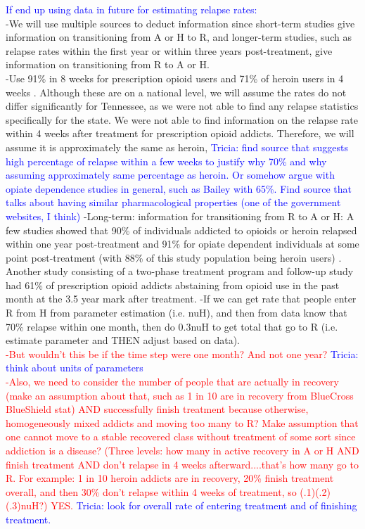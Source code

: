 \documentclass[12pt]{article}
\begin{document}
\textcolor{blue}{If end up using data in future for estimating relapse rates:} \\
-We will use multiple sources to deduct information since short-term studies give information on transitioning from A or H to R, and longer-term studies, such as relapse rates within the first year or within three years post-treatment, give information on transitioning from R to A or H. \\
 -Use 91\% in 8 weeks for prescription opioid users and 71\% of heroin users in 4 weeks \cite{Weiss, Smyth}. Although these are on a national level, we will assume the rates do not differ significantly for Tennessee, as we were not able to find any relapse statistics specifically for the state. We were not able to find information on the relapse rate within 4 weeks after treatment for prescription opioid addicts. Therefore, we will assume it is approximately the same as heroin, \textcolor{blue}{Tricia: find source that suggests high percentage of relapse within a few weeks to justify why 70\% and why assuming approximately same percentage as heroin. Or somehow argue with opiate dependence studies in general, such as Bailey with 65\%. Find source that talks about having similar pharmacological properties (one of the government websites, I think)} 
-Long-term: information for transitioning from R to A or H:
A few studies showed that 90\% of individuals addicted to opioids or heroin relapsed within one year post-treatment and 91\% for opiate dependent individuals at some point post-treatment (with 88\% of this study population being heroin users) \cite{Bailey, Smyth}. Another study consisting of a two-phase treatment program and follow-up study had 61\% of prescription opioid addicts abstaining from opioid use in the past month at the 3.5 year mark after treatment. 
-If we can get rate that people enter R from H from parameter estimation (i.e. nuH), and then from data know that 70\% relapse within one month, then do 0.3nuH to get total that go to R (i.e. estimate parameter and THEN adjust based on data).\\ 
\textcolor{red}{-But wouldn't this be if the time step were one month? And not one year? \textcolor{blue}{Tricia: think about units of parameters} \\
-Also, we need to consider the number of people that are actually in recovery (make an assumption about that, such as 1 in 10 are in recovery from BlueCross BlueShield stat) AND successfully finish treatment because otherwise, homogeneously mixed addicts and moving too many to R? Make assumption that one cannot move to a stable recovered class without treatment of some sort since addiction is a disease? (Three levels: how many in active recovery in A or H AND finish treatment AND don't relapse in 4 weeks afterward....that's how many go to R. For example: 1 in 10 heroin addicts are in recovery, 20\% finish treatment overall, and then 30\% don't relapse within 4 weeks of treatment, so (.1)(.2)(.3)nuH?) YES.} \textcolor{blue}{Tricia: look for overall rate of entering treatment and of finishing treatment.\\}
\end{document}
